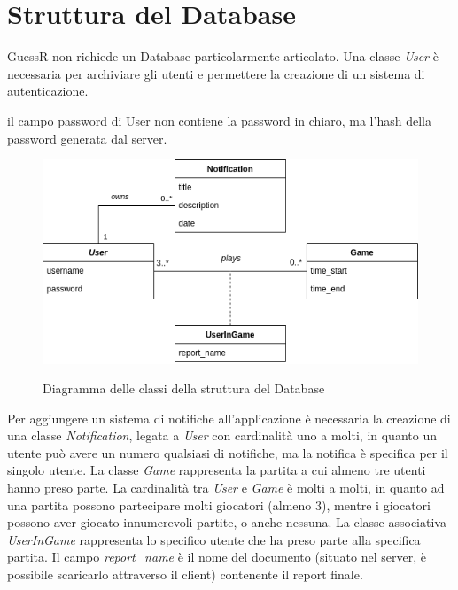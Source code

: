 \section{Struttura del Database}
GuessR non richiede un Database particolarmente articolato.\newline
Una classe \textit{User} è necessaria per archiviare gli utenti e permettere la creazione di un sistema di autenticazione.
\begin{warn}[ATTENTZIONE:]
il campo password di User non contiene la password in chiaro, ma l'hash della password generata dal server.
\end{warn}
\begin{figure}[H]
    \caption{Diagramma delle classi della struttura del Database}
    \centering
    \includegraphics[width=400mm]{img/uml/guessr_db.png}
    \label{fig:wireframe_main_menu}
\end{figure}
Per aggiungere un sistema di notifiche all'applicazione è necessaria la creazione di una classe \textit{Notification}, legata a \textit{User} con cardinalità uno a molti, in quanto un utente può avere un numero qualsiasi di notifiche, ma la notifica è specifica per il singolo utente.\newline
La classe \textit{Game} rappresenta la partita a cui almeno tre utenti hanno preso parte. La cardinalità tra \textit{User} e \textit{Game} è molti a molti, in quanto ad una partita possono partecipare molti giocatori (almeno 3), mentre i giocatori possono aver giocato innumerevoli partite, o anche nessuna.\newline
La classe associativa \textit{UserInGame} rappresenta lo specifico utente che ha preso parte alla specifica partita. Il campo \textit{report\_name} è il nome del documento (situato nel server, è possibile scaricarlo attraverso il client) contenente il report finale.

